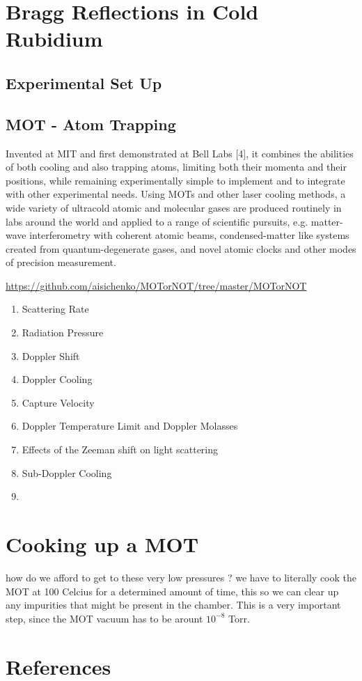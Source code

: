\documentclass[10pt]{article}
\begin{document}
\section*{Bragg Reflections in Cold Rubidium}




\subsection*{Experimental Set Up}


\subsection*{MOT - Atom Trapping}
Invented at MIT and first demonstrated at Bell Labs [4], it combines the abilities of both cooling and also trapping atoms, limiting both their momenta and their positions, while remaining experimentally simple to implement and to integrate with other experimental needs. Using MOTs and other laser cooling methods, a wide variety of ultracold atomic and molecular gases are produced routinely in labs around the world and applied to a range of scientific pursuits, e.g. matter-wave interferometry with coherent atomic beams, condensed-matter like systems created from quantum-degenerate gases, and novel atomic clocks and other modes of precision measurement.

\url{https://github.com/aisichenko/MOTorNOT/tree/master/MOTorNOT}


\begin{enumerate}
    \item Scattering Rate
    \item Radiation Pressure
    \item Doppler Shift
    \item Doppler Cooling
    \item Capture Velocity
    \item Doppler Temperature Limit and Doppler Molasses
    \item Effects of the Zeeman shift on light scattering
    \item Sub-Doppler Cooling
    \item 
\end{enumerate}


\section*{Cooking up a MOT}
how do we afford to get to these very low pressures ? we have to literally cook the MOT at 100 Celcius for a determined amount of time, this so we can clear up any impurities that might be present in the chamber. This is a very important step, since the MOT vacuum has to be arount $10^{-8}$ Torr.

\newpage
\section*{References}


\end{document}
